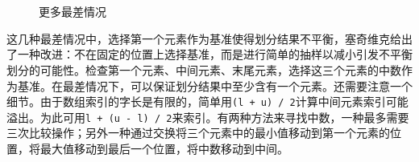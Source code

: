 \documentclass[b5paper]{ctexart}
\begin{document}
\begin{figure}[htbp]
   \centering
    \\
    \\
   \caption{更多最差情况}
   \label{fig:worst-cases-2}
\end{figure}

这几种最差情况中，选择第一个元素作为基准使得划分结果不平衡，塞奇维克给出了一种改进\cite{qsort-impl}：不在固定的位置上选择基准，而是进行简单的抽样以减小引发不平衡划分的可能性。检查第一个元素、中间元素、末尾元素，选择这三个元素的中数作为基准。在最差情况下，可以保证划分结果中至少含有一个元素。还需要注意一个细节。由于数组索引的字长是有限的，简单用\texttt{(l + u) / 2}计算中间元素索引可能溢出。为此可用\texttt{l + (u - l) / 2}来索引。有两种方法来寻找中数，一种最多需要三次比较操作\cite{3-way-part}；另外一种通过交换将三个元素中的最小值移动到第一个元素的位置，将最大值移动到最后一个位置，将中数移动到中间。
\end{document}
